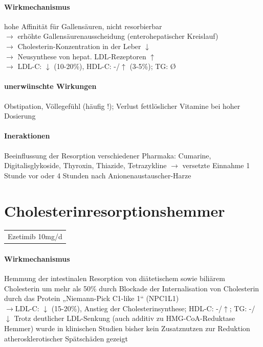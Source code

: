 \documentclass[10pt,a4paper]{report}
\begin{document}
\paragraph{Wirkmechanismus} %
\label{par:wirkmechanismus}
hohe Affinität für Gallensäuren, nicht resorbierbar\\
$\rightarrow$ erhöhte Gallensäurenausscheidung (enterohepatischer Kreislauf)\\
$\rightarrow$ Cholesterin-Konzentration in der Leber $\downarrow$ \\
$\rightarrow$ Neusynthese von hepat. LDL-Rezeptoren $\uparrow$ \\
$\rightarrow$ LDL-C: $\downarrow$ (10-20\%), HDL-C: -/$\uparrow$ (3-5\%); TG: Ø\\
\paragraph{unerwünschte Wirkungen} %
\label{par:unerw_nschte_wirkungen}
Obstipation, Völlegefühl (häufig !); Verlust fettlöslicher Vitamine bei hoher Dosierung
\paragraph{Ineraktionen} %
\label{par:ineraktionen}
Beeinflussung der Resorption verschiedener Pharmaka:
Cumarine, Digitalisglykoside, Thyroxin, Thiazide, Tetrazykline
$\rightarrow$ versetzte Einnahme 1 Stunde vor oder 4 Stunden nach Anionenaustauscher-Harze
\section{Cholesterinresorptionshemmer} %
\label{sec:cholesterinresorptionshemmer}
\begin{tabularx}{\textwidth}{X}
Ezetimib 10mg/d
\end{tabularx}
\paragraph{Wirkmechanismus} %
\label{par:wirkmechanismus}
Hemmung der intestinalen Resorption von diätetischem sowie biliärem Cholesterin um mehr als 50\% durch Blockade der Internalisation von Cholesterin durch das Protein „Niemann-Pick C1-like 1“ (NPC1L1)\\
$\rightarrow$LDL-C: $\downarrow$ (15-20\%), Anstieg der Cholesterinsynthese; HDL-C: -/$\uparrow$; TG: -/$\downarrow$
Trotz deutlicher LDL-Senkung (auch additiv zu HMG-CoA-Reduktase Hemmer) wurde in klinischen Studien bisher kein Zusatznutzen zur Reduktion atherosklerotischer Spätschäden gezeigt 
\end{document}
